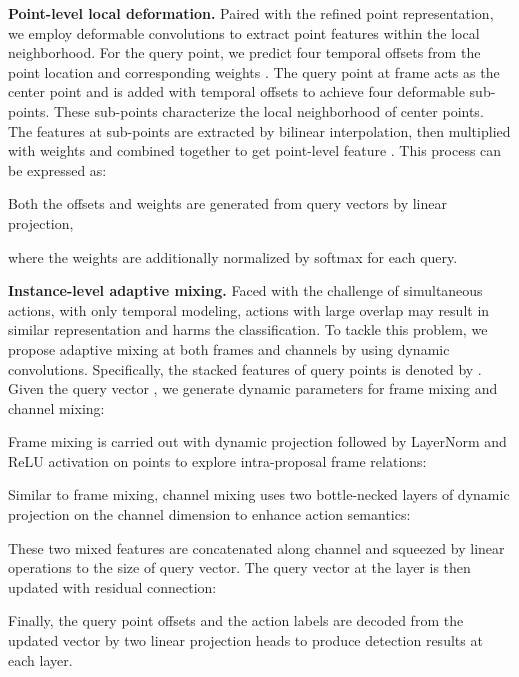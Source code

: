 \documentclass{article}
\renewcommand{\paragraph}[1]{\vspace{1.25mm}\noindent\textbf{#1}}
\begin{document}
\paragraph{Point-level local deformation.} Paired with the refined point representation, we employ deformable convolutions to extract point features within the local neighborhood. For the  query point, we predict four temporal offsets  from the point location and corresponding weights . The query point at frame  acts as the center point and is added with temporal offsets to achieve four deformable sub-points. These sub-points characterize the local neighborhood of center points. The features at sub-points are extracted by bilinear interpolation, then multiplied with weights and combined together to get point-level feature . This process can be expressed as:

Both the offsets and weights are generated from query vectors  by linear projection,

where the weights are additionally normalized by softmax for each query.

\paragraph{Instance-level adaptive mixing.}
Faced with the challenge of simultaneous actions, with only temporal modeling, actions with large overlap may result in similar representation and harms the classification. To tackle this problem, we propose adaptive mixing at both frames and channels by using dynamic convolutions. 
Specifically, the stacked features of query points is denoted by . Given the query vector {}, we generate dynamic parameters for frame mixing and channel mixing: 

Frame mixing is carried out with dynamic projection followed by LayerNorm and ReLU activation on  points to explore intra-proposal frame relations:

Similar to frame mixing, channel mixing uses two bottle-necked layers of dynamic projection on the channel dimension to enhance action semantics:

These two mixed features are concatenated along channel and squeezed by linear operations to the size of query vector. The query vector  at the  layer is then updated with residual connection:

Finally, the query point offsets and the action labels are decoded from the updated vector by two linear projection heads to produce detection results at each layer.
\end{document}
